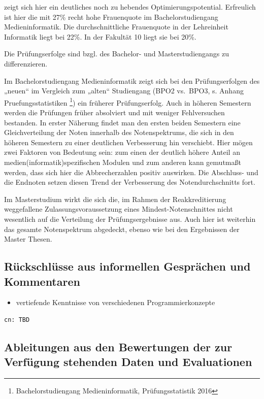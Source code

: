 zeigt sich hier ein deutliches noch zu hebendes Optimierungspotential.
Erfreulich ist hier die mit 27\% recht hohe Frauenquote im
Bachelorstudiengang Medieninformatik. Die durchschnittliche Frauenquote
in der Lehreinheit Informatik liegt bei 22\%. In der Fakultät 10 liegt
sie bei 20\%.

Die Prüfungserfolge sind bzgl. des Bachelor- und Masterstudiengangs zu
differenzieren.

Im Bachelorstudiengang Medieninformatik zeigt sich bei den
Prüfungserfolgen des „neuen`` im Vergleich zum „alten`` Studiengang
(BPO2 vs.~BPO3, s. Anhang Pruefungsstatistiken \footnote{Bachelorstudiengang
  Medieninformatik, Prüfungsstatistik 2016}) ein früherer
Prüfungserfolg. Auch in höheren Semestern werden die Prüfungen früher
absolviert und mit weniger Fehlversuchen bestanden. In erster Näherung
findet man den ersten beiden Semestern eine Gleichverteilung der Noten
innerhalb des Notenspektrums, die sich in den höheren Semestern zu einer
deutlichen Verbesserung hin verschiebt. Hier mögen zwei Faktoren von
Bedeutung sein: zum einen der deutlich höhere Anteil an
medien(informatik)spezifischen Modulen und zum anderen kann gemutmaßt
werden, dass sich hier die Abbrecherzahlen positiv auswirken. Die
Abschluss- und die Endnoten setzen diesen Trend der Verbesserung des
Notendurchschnitts fort.

Im Masterstudium wirkt die sich die, im Rahmen der Reakkreditierung
weggefallene Zulassungsvoraussetzung eines Mindest-Notenschnittes nicht
wesentlich auf die Verteilung der Prüfungsergebnisse aus. Auch hier ist
weiterhin das gesamte Notenspektrum abgedeckt, ebenso wie bei den
Ergebnissen der Master Thesen.

\subsection{Rückschlüsse aus informellen Gesprächen und
Kommentaren}\label{ruxfcckschluxfcsse-aus-informellen-gespruxe4chen-und-kommentaren}

\begin{itemize}
\tightlist
\item
  vertiefende Kenntnisse von verschiedenen Programmierkonzepte
\end{itemize}

\begin{verbatim}
cn: TBD
\end{verbatim}

\subsection{Ableitungen aus den Bewertungen der zur Verfügung
stehenden Daten und
Evaluationen}\label{ableitungen-aus-den-bewertungen-der-zur-verfuxfcgung-stehenden-daten-und-evaluationen}

